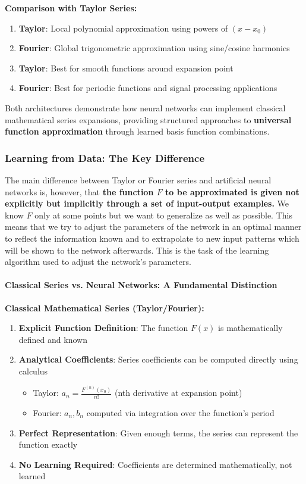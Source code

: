 \textbf{Comparison with Taylor Series:}

\begin{enumerate}
\item \textbf{Taylor}: Local polynomial approximation using powers of $(x-x_0)$
\item \textbf{Fourier}: Global trigonometric approximation using sine/cosine harmonics
\item \textbf{Taylor}: Best for smooth functions around expansion point
\item \textbf{Fourier}: Best for periodic functions and signal processing applications
\end{enumerate}

Both architectures demonstrate how neural networks can implement classical mathematical series expansions, providing structured approaches to \textbf{universal function approximation} through learned basis function combinations.

\subsubsection{Learning from Data: The Key Difference}
\label{subsubsec:learning-from-data}

The main difference between Taylor or Fourier series and artificial neural networks is, however, that \textbf{the function $F$ to be approximated is given not explicitly but implicitly through a set of input-output examples.} We know $F$ only at some points but we want to generalize as well as possible. This means that we try to adjust the parameters of the network in an optimal manner to reflect the information known and to extrapolate to new input patterns which will be shown to the network afterwards. This is the task of the learning algorithm used to adjust the network's parameters.

\paragraph{Classical Series vs. Neural Networks: A Fundamental Distinction}
\label{para:classical-vs-nn-distinction}

\textbf{Classical Mathematical Series (Taylor/Fourier):}

\begin{enumerate}
\item \textbf{Explicit Function Definition}: The function $F(x)$ is mathematically defined and known
\item \textbf{Analytical Coefficients}: Series coefficients can be computed directly using calculus
\begin{itemize}
\item Taylor: $a_n = \frac{F^{(n)}(x_0)}{n!}$ (nth derivative at expansion point)
\item Fourier: $a_n, b_n$ computed via integration over the function's period
\end{itemize}
\item \textbf{Perfect Representation}: Given enough terms, the series can represent the function exactly
\item \textbf{No Learning Required}: Coefficients are determined mathematically, not learned
\end{enumerate}

